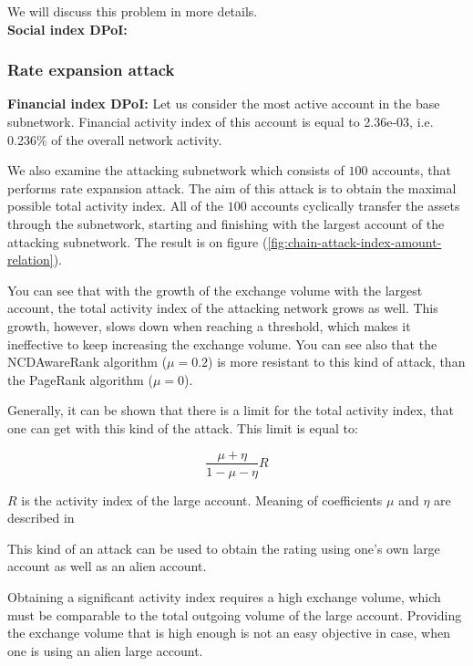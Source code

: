 \documentclass[a4paper,12pt]{article}
\begin{document}
We will discuss this problem in more details.\\
\textbf{Social index DPoI:}

\subsubsection{Rate expansion attack}

\textbf{Financial index DPoI:} Let us consider the most active account in the base subnetwork. Financial activity index of this account is equal to 2.36e-03, i.e. 0.236\% of the overall network activity. 

We also examine the attacking subnetwork which consists of $100$ accounts, that performs rate expansion attack. The aim of this attack is to obtain the maximal possible total activity index. All of the $100$ accounts cyclically transfer the assets through the subnetwork, starting and finishing with the largest account of the attacking subnetwork. The result is on figure (\ref{fig:chain-attack-index-amount-relation}).
 
You can see that with the growth of the exchange volume with the largest account, the total activity index of the attacking network grows as well. This growth, however, slows down when reaching a threshold, which makes it ineffective to keep increasing the exchange volume. You can see also that the NCDAwareRank algorithm ($\mu=0.2$) is more resistant to this kind of attack, than the PageRank algorithm ($\mu=0$).

Generally, it can be shown that there is a limit for the total activity index, that one can get with this kind of the attack. This limit is equal to:

 $$
 \frac{\mu+\eta}{1 - \mu - \eta} R
 $$ 
 
 $R$ is the activity index of the large account. Meaning of coefficients $\mu$ and $\eta$ are described in 

This kind of an attack can be used to obtain the rating using one's own large account as well as an alien account.

Obtaining a significant activity index requires a high exchange volume, which must be comparable to the total outgoing volume of the large account. Providing the exchange volume that is high enough is not an easy objective in case, when one is using an alien large account.\\
\end{document}
